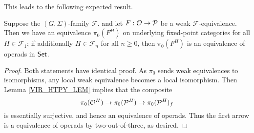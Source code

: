 \documentclass[a4paper,10pt
,draft
]{article}%
\renewcommand{\F}{\mathcal F}
\renewcommand{\1}{\eta}%
\begin{document}
This leads to the following expected result.
\begin{corollary}
      Suppose the $(G, \Sigma)$-family $\F$. %
      and let $F: \mathcal{O} \to \mathcal{P}$ be a weak $\F$-equivalence.
      Then we have an equivalence $\pi_0(F^H)$ on underlying fixed-point categories
      for all $H \in \F_1$;
      if additionally $H \in \F_n$ for all $n \geq 0$, then      
      $\pi_0(F^H)$ is an equivalence of operads in $\mathsf{Set}$.
\end{corollary}
\begin{proof}
      Both statements have identical proof.
      As $\pi_0$ sends weak equivalences to isomorphisms, any local weak equivalence becomes a local isomorphism.
      Then Lemma \ref{VIR_HTPY_LEM} implies that the composite
      \[
            \pi_0(\mathcal{O}^H) \to \pi_0(\mathcal{P}^H) \to \pi_0(\mathcal{P}^H)_f
      \]
      is essentially surjective, and hence an equivalence of operads.
      Thus the first arrow is a equivalence of operads by two-out-of-three, as desired.
\end{proof}


  
\end{document}
